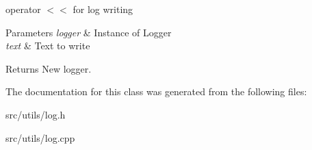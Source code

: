 operator $<$$<$ for log writing 


\begin{DoxyParams}{Parameters}
{\em logger} & Instance of Logger \\
\hline
{\em text} & Text to write \\
\hline
\end{DoxyParams}
\begin{DoxyReturn}{Returns}
New logger. 
\end{DoxyReturn}


The documentation for this class was generated from the following files\+:\begin{DoxyCompactItemize}
\item 
src/utils/log.\+h\item 
src/utils/log.\+cpp\end{DoxyCompactItemize}
